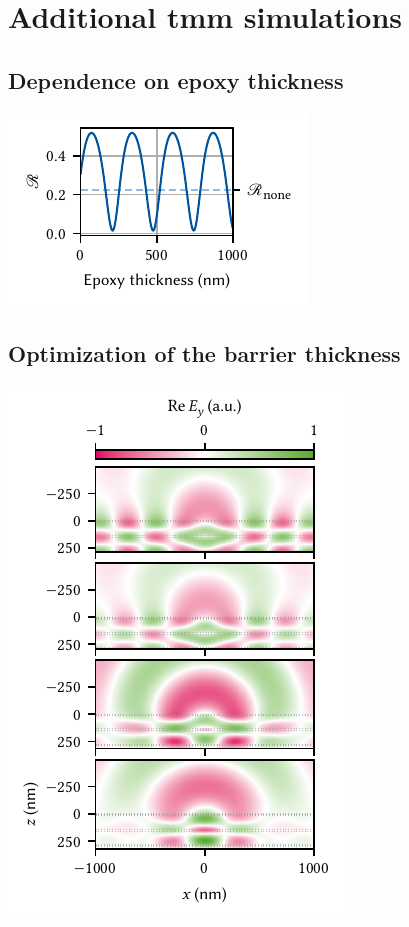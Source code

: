 \chapter{Additional \acrshort{tmm} simulations}\label{ch:app:exp:tmm}
\section{Dependence on epoxy thickness}\label{sec:app:exp:tmm:epoxy}

\begin{marginfigure}
    \centering
    \includegraphics{img/pdf/experiment/reflectance_epoxy}
    \caption[]{}
    \label{fig:app:exp:tmm:epoxy}
\end{marginfigure}

\section{Optimization of the barrier thickness}\label{sec:app:exp:tmm:opt}
\begin{marginfigure}
    \centering
    \includegraphics{img/pdf/experiment/tmm_green_opt}
    \caption[]{}
    \label{fig:app:exp:tmm:green:opt}
\end{marginfigure}
